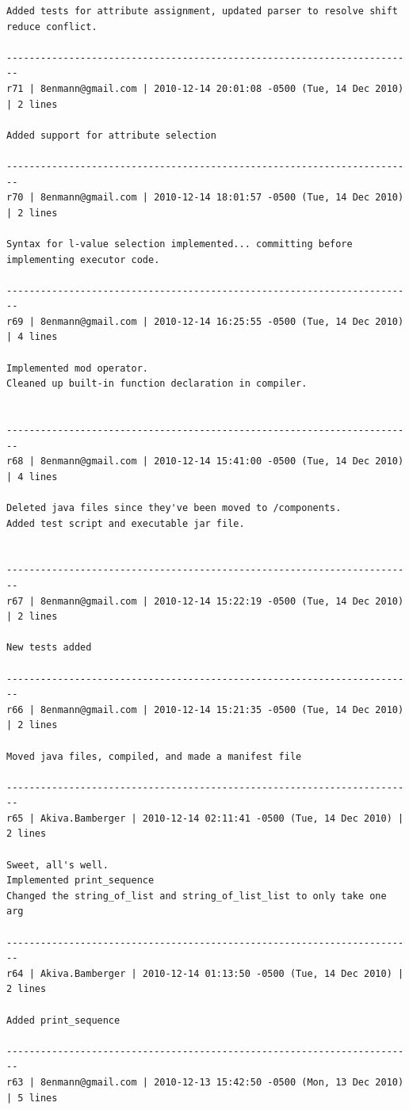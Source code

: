 \documentclass[12pt,A4]{book}
\begin{document}
\begin{verbatim}
Added tests for attribute assignment, updated parser to resolve shift reduce conflict.

------------------------------------------------------------------------
r71 | 8enmann@gmail.com | 2010-12-14 20:01:08 -0500 (Tue, 14 Dec 2010) | 2 lines

Added support for attribute selection

------------------------------------------------------------------------
r70 | 8enmann@gmail.com | 2010-12-14 18:01:57 -0500 (Tue, 14 Dec 2010) | 2 lines

Syntax for l-value selection implemented... committing before implementing executor code.

------------------------------------------------------------------------
r69 | 8enmann@gmail.com | 2010-12-14 16:25:55 -0500 (Tue, 14 Dec 2010) | 4 lines

Implemented mod operator.
Cleaned up built-in function declaration in compiler.


------------------------------------------------------------------------
r68 | 8enmann@gmail.com | 2010-12-14 15:41:00 -0500 (Tue, 14 Dec 2010) | 4 lines

Deleted java files since they've been moved to /components.
Added test script and executable jar file.


------------------------------------------------------------------------
r67 | 8enmann@gmail.com | 2010-12-14 15:22:19 -0500 (Tue, 14 Dec 2010) | 2 lines

New tests added

------------------------------------------------------------------------
r66 | 8enmann@gmail.com | 2010-12-14 15:21:35 -0500 (Tue, 14 Dec 2010) | 2 lines

Moved java files, compiled, and made a manifest file

------------------------------------------------------------------------
r65 | Akiva.Bamberger | 2010-12-14 02:11:41 -0500 (Tue, 14 Dec 2010) | 2 lines

Sweet, all's well.
Implemented print_sequence
Changed the string_of_list and string_of_list_list to only take one arg

------------------------------------------------------------------------
r64 | Akiva.Bamberger | 2010-12-14 01:13:50 -0500 (Tue, 14 Dec 2010) | 2 lines

Added print_sequence

------------------------------------------------------------------------
r63 | 8enmann@gmail.com | 2010-12-13 15:42:50 -0500 (Mon, 13 Dec 2010) | 5 lines


\end{verbatim}
\end{document}
